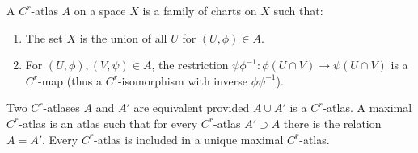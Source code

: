 A $C^r$-atlas $A$ on a space $X$ is a family of charts on $X$ such that:
\begin{enumerate}
\item[(1)] The set $X$ is the union of all $U$ for $(U, \phi) \in A$.
\item[(2)] For $(U, \phi), (V, \psi) \in A$, the restriction $\psi \phi^{-1} : \phi(U \cap V) \to \psi(U \cap V)$ is a $C^r$-map (thus a $C^r$-isomorphism with inverse $\phi \psi^{-1}$).
\end{enumerate}
Two $C^r$-atlases $A$ and $A'$ are equivalent provided $A \cup A'$ is a $C^r$-atlas. A maximal $C^r$-atlas is an atlas such that for every $C^r$-atlas $A' \supset A$ there is the relation $A = A'$. Every $C^r$-atlas is included in a unique maximal $C^r$-atlas.
